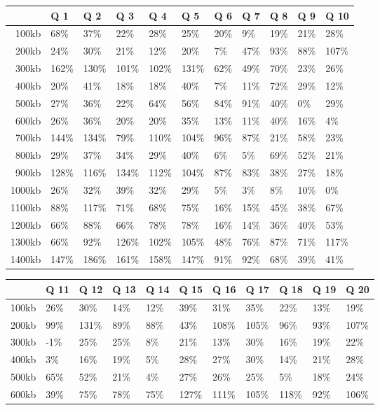 
\begin {table}[htpb]
\centering
\begin{tabular}{r|l|l|l|l|l|l|l|l|l|l}
&Q 1&Q 2&Q 3&Q 4&Q 5&Q 6&Q 7&Q 8&Q 9&Q 10\\
\hline
100kb&68\%&37\%&22\%&28\%&25\%&20\%&9\%&19\%&21\%&28\%\\
200kb&24\%&30\%&21\%&12\%&20\%&7\%&47\%&93\%&88\%&107\%\\
300kb&162\%&130\%&101\%&102\%&131\%&62\%&49\%&70\%&23\%&26\%\\
400kb&20\%&41\%&18\%&18\%&40\%&7\%&11\%&72\%&29\%&12\%\\
500kb&27\%&36\%&22\%&64\%&56\%&84\%&91\%&40\%&0\%&29\%\\
600kb&26\%&36\%&20\%&20\%&35\%&13\%&11\%&40\%&16\%&4\%\\
700kb&144\%&134\%&79\%&110\%&104\%&96\%&87\%&21\%&58\%&23\%\\
800kb&29\%&37\%&34\%&29\%&40\%&6\%&5\%&69\%&52\%&21\%\\
900kb&128\%&116\%&134\%&112\%&104\%&87\%&83\%&38\%&27\%&18\%\\
1000kb&26\%&32\%&39\%&32\%&29\%&5\%&3\%&8\%&10\%&0\%\\
1100kb&88\%&117\%&71\%&68\%&75\%&16\%&15\%&45\%&38\%&67\%\\
1200kb&66\%&88\%&66\%&78\%&78\%&16\%&14\%&36\%&40\%&53\%\\
1300kb&66\%&92\%&126\%&102\%&105\%&48\%&76\%&87\%&71\%&117\%\\
1400kb&147\%&186\%&161\%&158\%&147\%&91\%&92\%&68\%&39\%&41\%\\
\end{tabular}
\newline
\vspace*{0.5 cm}
\newline
\begin{tabular}{r|l|l|l|l|l|l|l|l|l|l}
&Q 11&Q 12&Q 13&Q 14&Q 15&Q 16&Q 17&Q 18&Q 19&Q 20\\
\hline
100kb&26\%&30\%&14\%&12\%&39\%&31\%&35\%&22\%&13\%&19\%\\
200kb&99\%&131\%&89\%&88\%&43\%&108\%&105\%&96\%&93\%&107\%\\
300kb&-1\%&25\%&25\%&8\%&21\%&13\%&30\%&16\%&19\%&22\%\\
400kb&3\%&16\%&19\%&5\%&28\%&27\%&30\%&14\%&21\%&28\%\\
500kb&65\%&52\%&21\%&4\%&27\%&26\%&25\%&5\%&18\%&24\%\\
600kb&39\%&75\%&78\%&75\%&127\%&111\%&105\%&118\%&92\%&106\%\\

\end{tabular}
\end{table}

